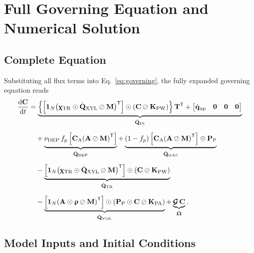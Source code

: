 \documentclass[12pt,a4paper]{article}
\newcommand{\oN}{\mathbf{1}_N}
\begin{document}
\section{Full Governing Equation and Numerical Solution}\label{sec:full}

\subsection{Complete Equation}

Substituting all flux terms into Eq.~\eqref{eq:governing}, the fully expanded governing equation reads
\begin{align}\label{eq:full}
    \dv{\mathbf{C}}{t}
    &= \underbrace{\left\{\left[\oN\!\left(\bm{\upchi}_\mathrm{TR}\odot\dot{\mathbf{Q}}_\mathrm{XYL} \oslash \mathbf{M}\right)^\mathsf{T}\right] \odot \left(\mathbf{C} \oslash \mathbf{K}_\mathrm{PW}\right)\right\}\mathbf{T}^{\mathsf T}
    +
    \begin{bmatrix}
    \dot{\mathbf q}_\mathrm{up} & \mathbf 0 & \mathbf 0 & \mathbf 0
    \end{bmatrix}}_{\dot{\mathbf{Q}}_\mathrm{IN}} \nonumber\\[6pt]
    &\quad+ \underbrace{\nu_\mathrm{DEP}\,f_p\left[\mathbf{C}_\mathrm{A}\!\left(\mathbf{A}\oslash\mathbf{M}\right)^\mathsf{T}\right]}_{\dot{\mathbf{Q}}_\mathrm{DEP}}
    + \underbrace{(1-f_p)\left[\mathbf{C}_\mathrm{A}\!\left(\mathbf{A}\oslash\mathbf{M}\right)^\mathsf{T}\right]\odot\mathbf{P}_\mathrm{P}}_{\dot{\mathbf{Q}}_\mathrm{GAS}} \nonumber\\[6pt]
    &\quad- \underbrace{\left[\oN\!\left(\bm{\upchi}_\mathrm{TR}\odot\dot{\mathbf{Q}}_\mathrm{XYL} \oslash \mathbf{M}\right)^\mathsf{T}\right] \odot \left(\mathbf{C} \oslash \mathbf{K}_\mathrm{PW}\right)}_{\dot{\mathbf{Q}}_\mathrm{TR}} \nonumber\\[6pt]
    &\quad- \underbrace{\left[\oN\!\left(\mathbf{A}\odot \bm{\uprho}\oslash\mathbf{M}\right)^\mathsf{T}\right]\odot\left(\mathbf{P}_\mathrm{P}\odot\mathbf{C}\oslash\mathbf{K}_\mathrm{PA}\right)}_{\dot{\mathbf{Q}}_\mathrm{VOL}}
    + \underbrace{\bm{\mathcal{G}}\,\mathbf{C}}_{\dot{\bm{\Upomega}}}.
\end{align}


\subsection{Model Inputs and Initial Conditions}
\end{document}
